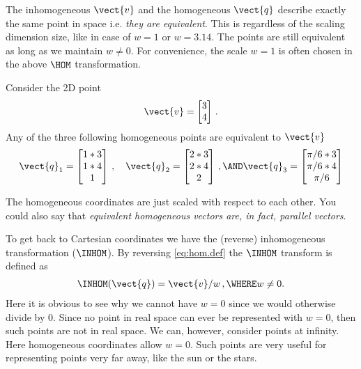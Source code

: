 \documentclass[oneandhalfcolumn]{coursenotes-handout}
\begin{document}
The inhomogeneous \(\vect{v}\) and the homogeneous \(\vect{q}\) describe exactly the same point in space i.e. \emph{they are equivalent}. This is regardless of the scaling dimension size, like in case of \(w = 1\) or \(w = 3.14\). The points are still equivalent as long as we maintain \(w \neq 0\). For convenience, the scale \(w = 1\) is often chosen in the above \( \HOM \) transformation.

\begin{example}\label{exp:homogeneous-coords}%
  Consider the 2D point
  \begin{align}
      \vect{v} = \begin{bmatrix} 3 \\ 4 \end{bmatrix} \,.
  \end{align}
  Any of the three following homogeneous points are equivalent to \(\vect{v}\)
  \begin{align}
      \vect{q}_1 = \begin{bmatrix} 1 * 3 \\ 1 * 4 \\ 1 \end{bmatrix} \,, \quad
      \vect{q}_2 = \begin{bmatrix} 2 * 3 \\ 2 * 4 \\ 2 \end{bmatrix} \,, \AND
      \vect{q}_3 = \begin{bmatrix} \pi/6 * 3 \\ \pi/6 * 4 \\ \pi/6 \end{bmatrix}
  \end{align}

  The homogeneous coordinates are just scaled with respect to each other. You could also say that \emph{equivalent homogeneous vectors are, in fact, parallel vectors}.
\end{example}

To get back to Cartesian coordinates we have the (reverse) inhomogeneous transformation (\( \INHOM \)). By reversing \cref{eq:hom.def} the \( \INHOM \) transform is defined as
\begin{align}
  \INHOM (\vect{q}) = \vect{v} / w \,, \WHERE w \neq 0. \label{eq:inhom.def}
\end{align}
Here it is obvious to see why we cannot have \(w = 0\) since we would otherwise divide by \(0\). Since no point in real space can ever be represented with \(w = 0\), then such points are not in real space. We can, however, consider points at infinity. Here homogeneous coordinates allow \(w = 0\). Such points are very useful for representing points very far away, like the sun or the stars.
\end{document}
